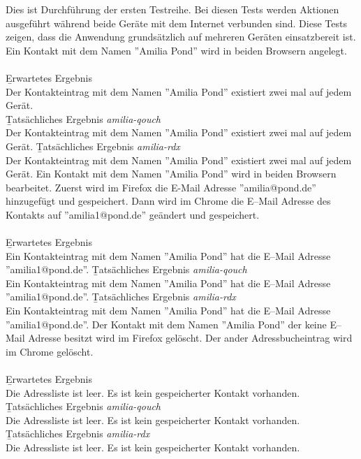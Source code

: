 Dies ist Durchführung der ersten Testreihe.
Bei diesen Tests werden Aktionen ausgeführt während beide Geräte mit dem Internet verbunden sind.
Diese Tests zeigen, dass die Anwendung grundsätzlich auf mehreren Geräten einsatzbereit ist.
%
Ein Kontakt mit dem Namen ''Amilia Pond'' wird in beiden Browsern angelegt.\\\\
\b{Erwartetes Ergebnis}\\
Der Kontakteintrag mit dem Namen ''Amilia Pond'' existiert zwei mal auf jedem Gerät.\\
\b{Tatsächliches Ergebnis \it{amilia-qouch}}\\
Der Kontakteintrag mit dem Namen ''Amilia Pond'' existiert zwei mal auf jedem Gerät.
\b{Tatsächliches Ergebnis \it{amilia-rdx}}\\
Der Kontakteintrag mit dem Namen ''Amilia Pond'' existiert zwei mal auf jedem Gerät.
%
Ein Kontakt mit dem Namen ''Amilia Pond'' wird in beiden Browsern bearbeitet. Zuerst wird im Firefox die E-Mail Adresse ''amilia@pond.de'' hinzugefügt und gespeichert.
Dann wird im Chrome die E--Mail Adresse des Kontakts auf ''amilia1@pond.de'' geändert und gespeichert.\\\\
\b{Erwartetes Ergebnis}\\
Ein Kontakteintrag mit dem Namen ''Amilia Pond'' hat die E--Mail Adresse ''amilia1@pond.de''.
\b{Tatsächliches Ergebnis \it{amilia-qouch}}\\
Ein Kontakteintrag mit dem Namen ''Amilia Pond'' hat die E--Mail Adresse ''amilia1@pond.de''.
\b{Tatsächliches Ergebnis \it{amilia-rdx}}\\
Ein Kontakteintrag mit dem Namen ''Amilia Pond'' hat die E--Mail Adresse ''amilia1@pond.de''.
%
Der Kontakt mit dem Namen ''Amilia Pond'' der keine E--Mail Adresse besitzt wird im Firefox gelöscht. Der ander Adressbucheintrag wird im Chrome gelöscht.\\\\
\b{Erwartetes Ergebnis}\\
Die Adressliste ist leer. Es ist kein gespeicherter Kontakt vorhanden.\\
\b{Tatsächliches Ergebnis \it{amilia-qouch}}\\
Die Adressliste ist leer. Es ist kein gespeicherter Kontakt vorhanden.\\
\b{Tatsächliches Ergebnis \it{amilia-rdx}}\\
Die Adressliste ist leer. Es ist kein gespeicherter Kontakt vorhanden.